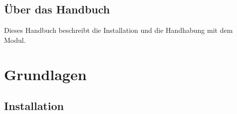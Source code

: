 \documentclass[12pt]{scrartcl}
\begin{document}
\subsection{Über das Handbuch}
\label{sec:handbuch-einleitung}
Dieses Handbuch beschreibt die Installation und die Handhabung
mit dem Modul. 


\newpage
\section{Grundlagen}
\label{sec:grundlagen}
\subsection{Installation}
\label{sec:grundlagen-installation}
\begin{enumerate}


\end{enumerate}
\end{document}
